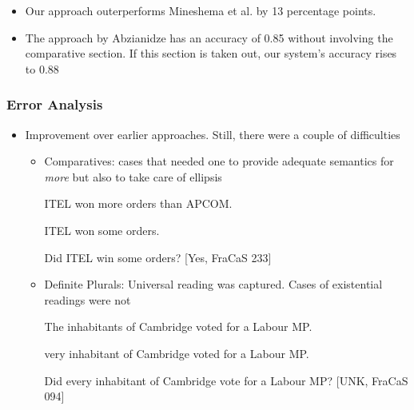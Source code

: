 \documentclass[11pt]{beamer}
\begin{document}
\begin{frame}[fragile]
\begin{itemize}
		


\item Our approach outerperforms Mineshema et al. by 13 percentage points. 

\item The approach by Abzianidze has an accuracy of 0.85 without involving the comparative section. If this section is taken out, our system's accuracy rises to 0.88

\end{itemize}







\end{frame}		
	
	
	\begin{frame}[fragile]
		\frametitle{Error Analysis}
		
		\begin{itemize}
			
			\item	Improvement over earlier approaches. Still, there were a couple of difficulties
			
				\begin{itemize}
					
					\item Comparatives: cases that needed one to provide
					adequate semantics for \textit{more} but also to take care of ellipsis
					
			\begin{exe}
				\ex				
	\hskip 0.05in ITEL won more orders than APCOM.
	
	\hskip 0.05in ITEL won some orders.
	
	
	\hskip 0.05in  	Did ITEL win some orders? [Yes, FraCaS 233]				
					
\end{exe}		
\item Definite Plurals: Universal reading was captured. Cases of existential readings were not

\begin{exe}
	\ex	


\hskip 0.05in The inhabitants of Cambridge voted for a Labour MP.

\hskip 0.05in very inhabitant of Cambridge voted for a Labour MP.


\hskip 0.05in  	Did every inhabitant of Cambridge vote for a Labour MP? [UNK, FraCaS 094]			
					
		\end{exe}	
	
\end{itemize}\end{itemize}

\end{frame}	
\end{document}
